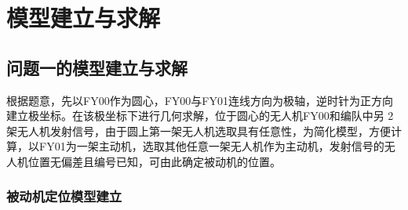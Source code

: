 \documentclass[withoutpreface,bwprint]{cumcmthesis} %
\begin{document}
\section{模型建立与求解}
\subsection{问题一的模型建立与求解}


根据题意，先以FY00作为圆心，FY00与FY01连线方向为极轴，逆时针为正方向建立极坐标。在该极坐标下进行几何求解，位于圆心的无人机FY00和编队中另 2 架无人机发射信号，由于圆上第一架无人机选取具有任意性，为简化模型，方便计算，以FY01为一架主动机，选取其他任意一架无人机作为主动机，发射信号的无人机位置无偏差且编号已知，可由此确定被动机的位置。

\subsubsection{被动机定位模型建立}
\end{document}
